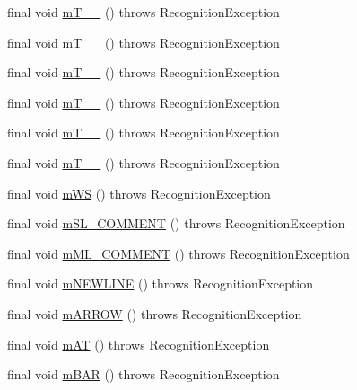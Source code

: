 \begin{DoxyCompactItemize}
final void \hyperlink{classorg_1_1tzi_1_1use_1_1parser_1_1use_1_1_u_s_e_lexer_a72ac4eebe41dfcdd08d180a19d80da3d}{m\-T\-\_\-\-\_} ()  throws Recognition\-Exception 
\item 
final void \hyperlink{classorg_1_1tzi_1_1use_1_1parser_1_1use_1_1_u_s_e_lexer_a2627e3b9a33653b24d822cc84eecc1a8}{m\-T\-\_\-\-\_} ()  throws Recognition\-Exception 
\item 
final void \hyperlink{classorg_1_1tzi_1_1use_1_1parser_1_1use_1_1_u_s_e_lexer_ad54416f4fa137b4c3dbe2d299f57718f}{m\-T\-\_\-\-\_} ()  throws Recognition\-Exception 
\item 
final void \hyperlink{classorg_1_1tzi_1_1use_1_1parser_1_1use_1_1_u_s_e_lexer_a22c4d3fcf8d176f9acc015d846ee378d}{m\-T\-\_\-\-\_} ()  throws Recognition\-Exception 
\item 
final void \hyperlink{classorg_1_1tzi_1_1use_1_1parser_1_1use_1_1_u_s_e_lexer_aca9cca4cbfa44ad4130525a7e1a67487}{m\-T\-\_\-\-\_} ()  throws Recognition\-Exception 
\item 
final void \hyperlink{classorg_1_1tzi_1_1use_1_1parser_1_1use_1_1_u_s_e_lexer_a25e872185dca744bdcfc5a1e837ce2bb}{m\-T\-\_\-\-\_} ()  throws Recognition\-Exception 
\item 
final void \hyperlink{classorg_1_1tzi_1_1use_1_1parser_1_1use_1_1_u_s_e_lexer_ad214c68fe47f075bc083bfc1745dc014}{m\-W\-S} ()  throws Recognition\-Exception 
\item 
final void \hyperlink{classorg_1_1tzi_1_1use_1_1parser_1_1use_1_1_u_s_e_lexer_adf66b3151179e06578580e63b9e11ebd}{m\-S\-L\-\_\-\-C\-O\-M\-M\-E\-N\-T} ()  throws Recognition\-Exception 
\item 
final void \hyperlink{classorg_1_1tzi_1_1use_1_1parser_1_1use_1_1_u_s_e_lexer_ad91e5875fa063783495a14de62dbfde4}{m\-M\-L\-\_\-\-C\-O\-M\-M\-E\-N\-T} ()  throws Recognition\-Exception 
\item 
final void \hyperlink{classorg_1_1tzi_1_1use_1_1parser_1_1use_1_1_u_s_e_lexer_ad2083aa0a4802c83c222fe2d38f49691}{m\-N\-E\-W\-L\-I\-N\-E} ()  throws Recognition\-Exception 
\item 
final void \hyperlink{classorg_1_1tzi_1_1use_1_1parser_1_1use_1_1_u_s_e_lexer_aedf067d373804c8e18856fcdc472296f}{m\-A\-R\-R\-O\-W} ()  throws Recognition\-Exception 
\item 
final void \hyperlink{classorg_1_1tzi_1_1use_1_1parser_1_1use_1_1_u_s_e_lexer_ae77a21aba47bc96b72f34b594e31af11}{m\-A\-T} ()  throws Recognition\-Exception 
\item 
final void \hyperlink{classorg_1_1tzi_1_1use_1_1parser_1_1use_1_1_u_s_e_lexer_af7e17f6818f5ea6aa97bdde6599d6cbe}{m\-B\-A\-R} ()  throws Recognition\-Exception 

\end{DoxyCompactItemize}
